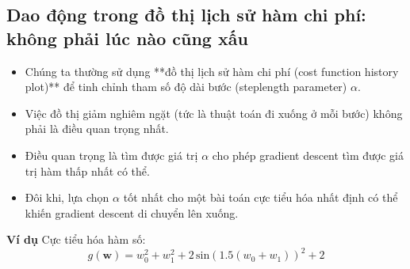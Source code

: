 \documentclass{book}
\begin{document}
\subsection{Dao động trong đồ thị lịch sử hàm chi phí: không phải lúc nào cũng xấu}
\begin{itemize}
    \item Chúng ta thường sử dụng **đồ thị lịch sử hàm chi phí (cost function history plot)** để tinh chỉnh tham số độ dài bước (steplength parameter) $\alpha$.
    \item Việc đồ thị giảm nghiêm ngặt (tức là thuật toán đi xuống ở mỗi bước) không phải là điều quan trọng nhất.
    \item Điều quan trọng là tìm được giá trị $\alpha$ cho phép gradient descent tìm được giá trị hàm thấp nhất có thể.
    \item Đôi khi, lựa chọn $\alpha$ tốt nhất cho một bài toán cực tiểu hóa nhất định có thể khiến gradient descent di chuyển lên xuống.
\end{itemize}
\textbf{Ví dụ}
Cực tiểu hóa hàm số:
\begin{equation*}
    g\left(\mathbf{w}\right) = w_0^2 + w_1^2 + 2\,\text{sin}\left(1.5\left(w_0 + w_1\right)\right)^2 + 2
\end{equation*} 
\end{document}
